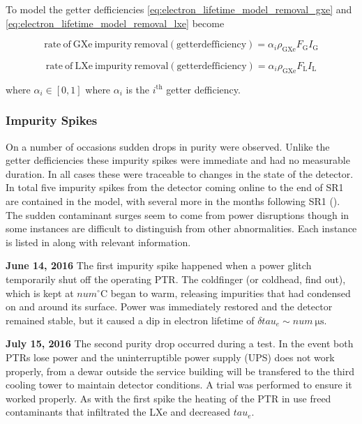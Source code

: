 {To model the getter defficiencies \eqref{eq:electron_lifetime_model_removal_gxe} and \eqref{eq:electron_lifetime_model_removal_lxe}
become

\begin{equation}
\mathrm{rate\ of\ GXe\ impurity\ removal (getter defficiency)} = \alpha_i \rho_{\mathrm{GXe}} F_{\mathrm{G}} I_{\mathrm{G}}
\end{equation}

\begin{equation}
\mathrm{rate\ of\ LXe\ impurity\ removal (getter defficiency)} = \alpha_i \rho_{\mathrm{GXe}} F_{\mathrm{L}} I_{\mathrm{L}}
\end{equation}

\noindent where $\alpha_i \in [0, 1]$ where $\alpha_i$ is the $i^{\mathrm{th}}$ getter defficiency.



\subsubsection{Impurity Spikes}
\label{subsubsec:electron_lifetime_model_detector_effects_spikes}
On a number of occasions sudden drops in purity were observed.  Unlike the getter defficiencies these impurity spikes were immediate and
had no measurable duration.  In all cases these were traceable to changes in the state of the detector.  In total five impurity spikes
from the detector coming online to the end of SR1 are contained in the model, with several more in the months following SR1
(\secref{}).  The
sudden contaminant surges seem to come from power disruptions though in some instances are difficult to distinguish from other
abnormalities.  Each instance is listed in  along with relevant
information.

\textbf{June 14, 2016}  The first impurity spike happened when a power glitch temporarily shut off the operating PTR.  The coldfinger (or
coldhead, find out), which is kept at $num^{\circ} \mathrm{C}$ began to warm, releasing impurities that had condensed on and around its
surface.  Power was immediately restored and the detector remained stable, but it caused a dip in electron lifetime of
$\delta tau_e \sim num\ \mathrm{\mu s}$.

\textbf{July 15, 2016}  The second purity drop occurred during a \lntwo test.  In the event both PTRs lose power and the uninterruptible
power supply
(UPS) does not work properly, \lntwo from a dewar outside the service building will be transfered to the third cooling tower to maintain
detector conditions.  A trial was performed to ensure it worked properly.  As with the first spike the heating of the PTR in use freed
contaminants that infiltrated the LXe and decreased $tau_e$.

}
